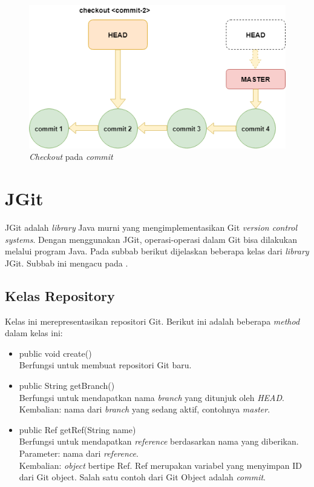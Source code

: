  
\begin{figure}[H]
	\centering
		\includegraphics[scale=0.6]{Gambar/gitcheckoutcommit.png}
	\caption{\textit{Checkout} pada \textit{commit}}
	\label{fig:git_checkout}
\end{figure}

\section{JGit}
\label{sec:jgit}
JGit adalah \textit{library} Java murni yang mengimplementasikan Git \textit{version control systems}\cite{JGit}. Dengan menggunakan JGit, operasi-operasi dalam Git bisa dilakukan melalui program Java. Pada subbab berikut dijelaskan beberapa kelas dari \textit{library} JGit. Subbab ini mengacu pada \cite{JGit_java_doc}. 

\subsection{Kelas Repository}
\label{subsec:repository}
Kelas ini merepresentasikan repositori Git. Berikut ini adalah beberapa \textit{method} dalam kelas ini:
\begin{itemize}
\item public void create()\\
Berfungsi untuk membuat repositori Git baru. 
\item public String getBranch()\\
Berfungsi untuk mendapatkan nama \textit{branch} yang ditunjuk oleh \textit{HEAD}.\\
Kembalian: nama dari \textit{branch} yang sedang aktif, contohnya \textit{master}.
\item public Ref getRef(String name)\\
Berfungsi untuk mendapatkan \textit{reference} berdasarkan nama yang diberikan.\\
Parameter: nama dari \textit{reference}.\\
Kembalian: \textit{object} bertipe Ref. Ref merupakan variabel yang menyimpan ID dari Git object. Salah satu contoh dari Git Object adalah \textit{commit}. 
\end{itemize} 

